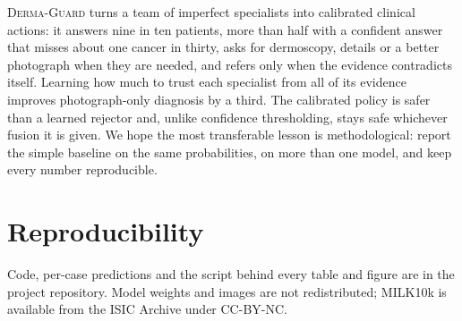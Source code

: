 \documentclass[conference]{IEEEtran}
\newcommand{\dguard}{\textsc{Derma-Guard}}
\begin{document}
\dguard{} turns a team of imperfect specialists into calibrated clinical actions: it answers
nine in ten patients, more than half with a confident answer that misses about one cancer
in thirty, asks for dermoscopy, details or a better photograph when they are needed, and
refers only when the evidence contradicts itself. Learning how much to trust each specialist
from all of its evidence improves photograph-only diagnosis by a third. The calibrated
policy is safer than a learned rejector and, unlike confidence thresholding, stays safe
whichever fusion it is given. We hope the most transferable lesson is methodological:
report the simple baseline on the same probabilities, on more than one model, and keep
every number reproducible.

\section*{Reproducibility}
Code, per-case predictions and the script behind every table and figure are in the project
repository. Model weights and images are not redistributed; MILK10k is available from the
ISIC Archive under CC-BY-NC.



\end{document}
